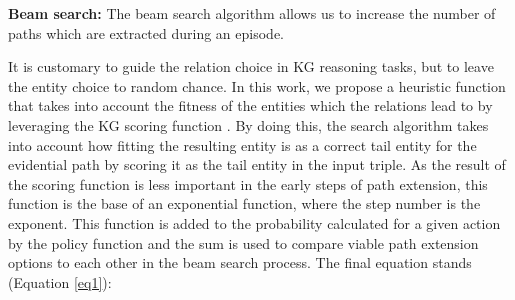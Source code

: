 \noindent\textbf{Beam search: }
The beam search algorithm allows us to increase the number of paths which are extracted during an episode. 

It is customary to guide the relation choice in KG reasoning tasks, but to leave the entity choice to random chance. In this work, %
we propose a heuristic function that takes into account the fitness of the entities which the relations lead to by leveraging the KG scoring function \cite{trouillon2016complex}. %
By doing this, the search algorithm takes into account how fitting the resulting entity is as a correct tail entity for the evidential path by scoring it as the tail entity in the input triple. As the result of the scoring function is less important in the early steps of path extension, this function is the base of an exponential function, where the step number is the exponent. This function is added to the probability calculated for a given action by the policy function and the sum is used to compare viable path extension options to each other in the beam search process. The final equation stands (Equation \ref{eq1}): %

